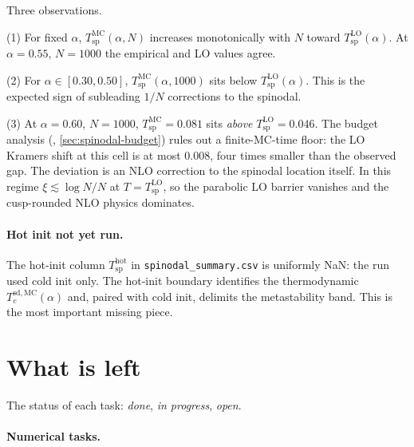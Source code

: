 \documentclass[11pt]{article}
\newcommand{\Tsp}{T_{\mathrm{sp}}}
\begin{document}
Three observations.

(1) For fixed $\alpha$, $\Tsp^{\mathrm{MC}}(\alpha, N)$ increases
monotonically with $N$ toward $\Tsp^{\mathrm{LO}}(\alpha)$.  At
$\alpha = 0.55$, $N = 1000$ the empirical and LO values agree.

(2) For $\alpha \in [0.30, 0.50]$, $\Tsp^{\mathrm{MC}}(\alpha, 1000)$
sits below $\Tsp^{\mathrm{LO}}(\alpha)$.  This is the expected sign of
subleading $1/N$ corrections to the spinodal.

(3) At $\alpha = 0.60$, $N = 1000$, $\Tsp^{\mathrm{MC}} = 0.081$ sits
\emph{above} $\Tsp^{\mathrm{LO}} = 0.046$.  The budget analysis
(, \cref{sec:spinodal-budget}) rules out a
finite-MC-time floor: the LO Kramers shift at this cell is at most
$0.008$, four times smaller than the observed gap.  The deviation is
an NLO correction to the spinodal location itself.  In this regime
$\xi \lesssim \log N / N$ at $T = \Tsp^{\mathrm{LO}}$, so the
parabolic LO barrier vanishes and the cusp-rounded NLO physics
dominates.

\paragraph{Hot init not yet run.}
The hot-init column $\Tsp^{\mathrm{hot}}$ in
\texttt{spinodal\_summary.csv} is uniformly NaN: the run used
cold init only.  The hot-init boundary identifies the thermodynamic
$T_c^{\mathrm{sd},\mathrm{MC}}(\alpha)$ and, paired with cold init,
delimits the metastability band.  This is the most important missing
piece.

\section{What is left}
\label{sec:left}

The status of each task: \emph{done}, \emph{in progress}, \emph{open}.

\paragraph{Numerical tasks.}
\end{document}
